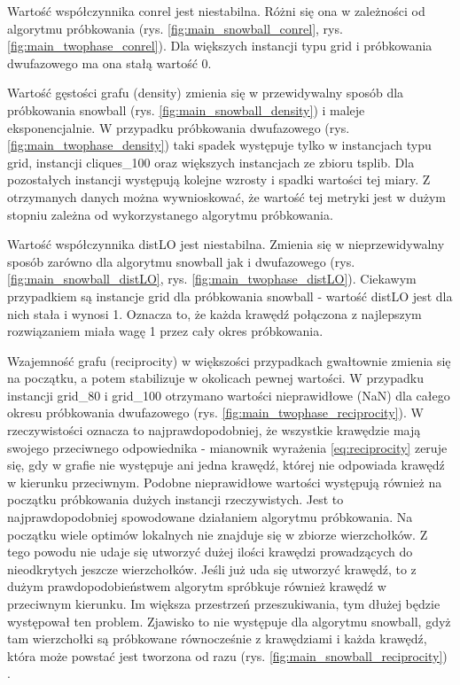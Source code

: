 Wartość współczynnika conrel jest niestabilna. Różni się ona w zależności od algorytmu próbkowania (rys. \ref{fig:main_snowball_conrel}, rys. \ref{fig:main_twophase_conrel}).
Dla większych instancji typu grid i próbkowania dwufazowego ma ona stałą wartość 0.

Wartość gęstości grafu (density) zmienia się w przewidywalny sposób dla próbkowania snowball (rys. \ref{fig:main_snowball_density}) i maleje eksponencjalnie.
W przypadku próbkowania dwufazowego (rys. \ref{fig:main_twophase_density}) taki spadek występuje tylko w instancjach typu grid, instancji cliques\_100 oraz większych
instancjach ze zbioru tsplib.
Dla pozostałych instancji występują kolejne wzrosty i spadki wartości tej miary.
Z otrzymanych danych można wywnioskować, że wartość tej metryki jest w dużym stopniu zależna od wykorzystanego algorytmu próbkowania.

Wartość współczynnika distLO jest niestabilna. Zmienia się w nieprzewidywalny sposób zarówno dla algorytmu snowball jak i dwufazowego (rys. \ref{fig:main_snowball_distLO}, rys. \ref{fig:main_twophase_distLO}).
Ciekawym przypadkiem są instancje grid dla próbkowania snowball - wartość distLO jest dla nich stała i wynosi 1. Oznacza to, że każda krawędź połączona
z najlepszym rozwiązaniem miała wagę 1 przez cały okres próbkowania.

Wzajemność grafu (reciprocity) w większości przypadkach gwałtownie zmienia się na początku, a potem stabilizuje w okolicach pewnej wartości.
W przypadku instancji grid\_80 i grid\_100 otrzymano wartości nieprawidłowe (NaN) dla całego okresu próbkowania dwufazowego (rys. \ref{fig:main_twophase_reciprocity}). W rzeczywistości oznacza to
najprawdopodobniej, że wszystkie krawędzie mają swojego przeciwnego odpowiednika - mianownik wyrażenia \ref{eq:reciprocity} zeruje się, gdy w grafie nie występuje ani jedna krawędź,
której nie odpowiada krawędź w kierunku przeciwnym. Podobne nieprawidłowe wartości występują również na początku próbkowania dużych instancji rzeczywistych.
Jest to najprawdopodobniej spowodowane działaniem algorytmu próbkowania. Na początku wiele optimów lokalnych nie znajduje się w zbiorze wierzchołków.
Z tego powodu nie udaje się utworzyć dużej ilości krawędzi prowadzących do nieodkrytych jeszcze wierzchołków.
Jeśli już uda się utworzyć krawędź, to z dużym prawdopodobieństwem algorytm spróbkuje również krawędź w przeciwnym kierunku.
Im większa przestrzeń przeszukiwania, tym dłużej będzie występował ten problem.
Zjawisko to nie występuje dla algorytmu snowball, gdyż tam wierzchołki są próbkowane równocześnie z krawędziami i każda krawędź, która może powstać jest
tworzona od razu (rys. \ref{fig:main_snowball_reciprocity}) .

